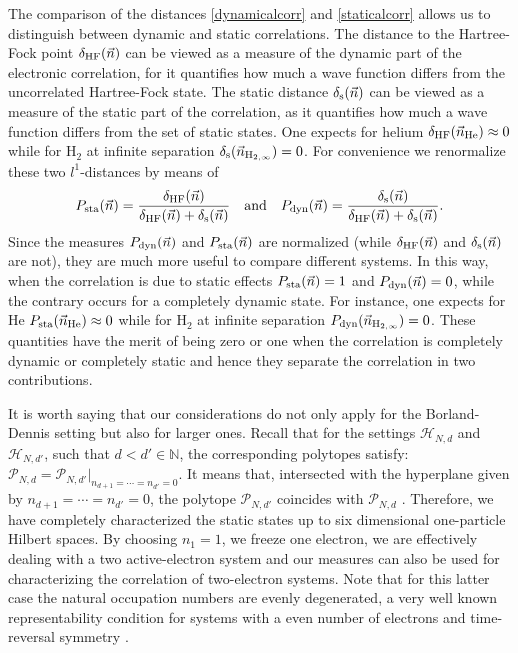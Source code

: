 \documentclass[aps,twocolumn,showpacs,pra,superscriptaddress,floatfix,longbibliography]{revtex4-1}
\newcommand{\N}{{\mathbb{N}}}
\newcommand{\7}{\dagger}
\begin{document}
The comparison of  the distances \eqref{dynamicalcorr} and
\eqref{staticalcorr} allows us to distinguish between dynamic 
and static correlations. The distance to the Hartree-Fock point
$\delta_{\rm HF}(\vec n)$
can be viewed as a measure of the dynamic part of the 
electronic correlation, for it quantifies how much a wave 
function differs from the uncorrelated 
Hartree-Fock state. The static distance $\delta_{\rm s}(\vec n)$ 
can be viewed as a measure of the 
static part of the correlation, as it quantifies how much a wave 
function differs from the set of static states. One expects for helium
$\delta_{\rm HF} (\vec n_{\rm He}) \approx 0$ while for 
H$_2$ at infinite separation 
$\delta_{\rm s} (\vec n_{{\rm H}_{2,\infty}}) = 0$.
For convenience we renormalize these two $l^1$-distances 
by means of
\begin{align}
  P_{\rm sta}(\vec n)  = 
  \frac{\delta_{\rm HF}(\vec n)}{\delta_{\rm HF}(\vec n)  
  +\delta_{\rm s}(\vec n)} 
\quad {\rm and}
 \quad  P_{\rm dyn}(\vec n) = \frac{\delta_{\rm s}(\vec n)}
  {\delta_{\rm HF}(\vec n) 
  +\delta_{\rm s}(\vec n)}.
\end{align}
Since the measures $P_{\rm dyn}(\vec n)$ and 
$P_{\rm sta}(\vec n)$ are normalized (while 
$\delta_{\rm HF}(\vec n)$ and $\delta_{\rm s}(\vec n)$ 
are not), they are much
more useful to compare different systems. 
In this way, when the correlation is due to static effects 
$P_{\rm sta}(\vec n)  = 1$ and $P_{\rm dyn}(\vec n)  = 0$,
while the contrary occurs for a completely dynamic state.
For instance, one expects for He 
$P_{\rm sta} (\vec n_{\rm He}) \approx 0$ 
while for H$_2$ at infinite separation 
$P_{\rm dyn} (\vec n_{{\rm H}_{2,\infty}}) = 0$.
These quantities have the merit of being zero or one when 
the correlation is completely dynamic or completely static
and hence they separate the correlation in two contributions.

It is worth saying that our considerations do not only 
apply for the Borland-Dennis setting but also for larger 
ones.  Recall that for the settings 
$\mathcal{H}_{N,d}$ and $\mathcal{H}_{N,d'}$, such that
$d < d' \in \N$, the corresponding polytopes satisfy:
$\mathcal{P}_{N,d} = {\mathcal{P}_{N,d'}}|
_{n_{d+1} = \cdots = n_{d'} = 0}$.
It means that, intersected with the hyperplane 
given by $n_{d+1} = \cdots = n_{d'} = 0$, the 
polytope $\mathcal{P}_{N,d'}$ coincides with 
$\mathcal{P}_{N,d}$ \cite{CS2013}. Therefore, 
we have completely characterized the static states up
to six dimensional one-particle Hilbert spaces. By choosing 
$n_1 =1$, we freeze one electron, we are effectively
dealing with a two active-electron system and our measures 
can also be used for characterizing the correlation of 
two-electron systems. Note that for this latter case the 
natural occupation numbers are evenly degenerated,
a very well known representability condition for systems 
with a even number of electrons and time-reversal symmetry 
\cite{SmithDarwin}.
\end{document}
